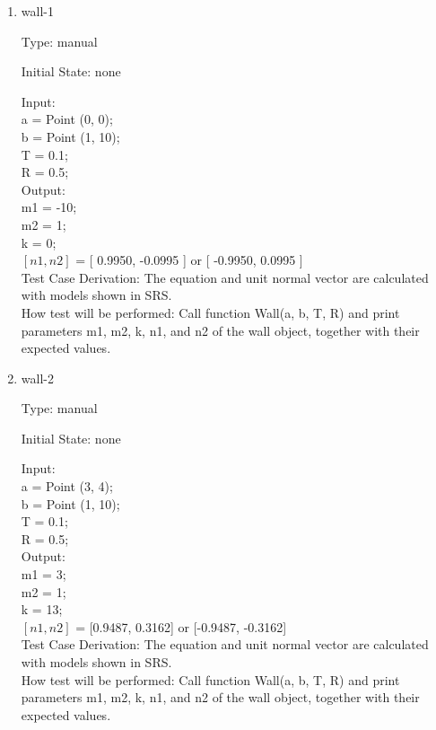 \documentclass[12pt, titlepage]{article}
\begin{document}
\begin{enumerate}

\item{wall-1\\}

Type: manual
					
Initial State: none
					
Input: \\
a = Point (0, 0);\\
b = Point (1, 10);\\
T = 0.1;\\
R = 0.5;\\
					
Output: \\
m1 = -10;\\
m2 = 1;\\
k = 0;\\
$\left[n1 , n2\right]$ = [ 0.9950, -0.0995 ] or [ -0.9950, 0.0995 ]\\

Test Case Derivation: The equation and unit normal vector are calculated with models shown in SRS.\\

How test will be performed: Call function Wall(a, b, T, R) and print parameters m1, m2, k, n1, and  n2 of the wall object, together with their expected values.

\item{wall-2\\}

Type: manual
					
Initial State: none
					
Input: \\
a = Point (3, 4);\\
b = Point (1, 10);\\
T = 0.1;\\
R = 0.5;\\
					
Output: \\
m1 = 3;\\
m2 = 1;\\
k = 13;\\
$\left[n1 , n2\right]$ = [0.9487, 0.3162] or [-0.9487, -0.3162]\\

Test Case Derivation: The equation and unit normal vector are calculated with models shown in SRS.\\

How test will be performed: Call function Wall(a, b, T, R) and print parameters m1, m2, k, n1, and  n2 of the wall object, together with their expected values.


\end{enumerate}
\end{document}
